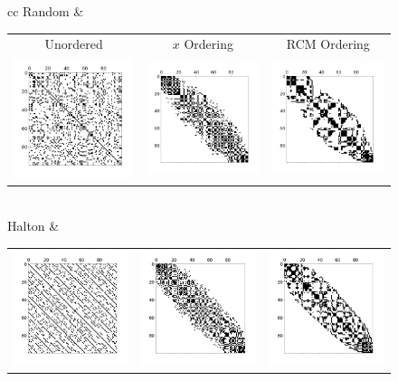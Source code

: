 \documentclass[12pt]{article}
\begin{document}
\begin{figure}[ht]
	\centering
	\begin{tabular}{cc}
		Random & \begin{tabular}{ccc}
			Unordered & $x$ Ordering & RCM Ordering \\
			\includegraphics[width=.2\textwidth]{spy_random_unordered.png} &
			\includegraphics[width=.2\textwidth]{spy_random_xorder.png} &
			\includegraphics[width=.2\textwidth]{spy_random_rcm.png} \end{tabular} \\
		Halton & \begin{tabular}{ccc}
			\includegraphics[width=.2\textwidth]{spy_halton_unordered.png} &
			\includegraphics[width=.2\textwidth]{spy_halton_xorder.png} &
			\includegraphics[width=.2\textwidth]{spy_halton_rcm.png} \end{tabular} \\

\end{tabular}
\end{figure}
\end{document}
